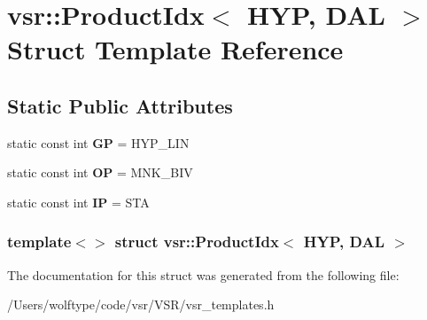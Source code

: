 \hypertarget{structvsr_1_1_product_idx_3_01_h_y_p_00_01_d_a_l_01_4}{\section{vsr\-:\-:Product\-Idx$<$ H\-Y\-P, D\-A\-L $>$ Struct Template Reference}
\label{structvsr_1_1_product_idx_3_01_h_y_p_00_01_d_a_l_01_4}
}
\subsection*{Static Public Attributes}
\begin{DoxyCompactItemize}
\item 
\hypertarget{structvsr_1_1_product_idx_3_01_h_y_p_00_01_d_a_l_01_4_ac0e6206708d4d06fa433d0d8071c514e}{static const int {\bfseries G\-P} = H\-Y\-P\-\_\-\-L\-I\-N}\label{structvsr_1_1_product_idx_3_01_h_y_p_00_01_d_a_l_01_4_ac0e6206708d4d06fa433d0d8071c514e}

\item 
\hypertarget{structvsr_1_1_product_idx_3_01_h_y_p_00_01_d_a_l_01_4_ae5b65ef5f90f28a8b465638ffb79276a}{static const int {\bfseries O\-P} = M\-N\-K\-\_\-\-B\-I\-V}\label{structvsr_1_1_product_idx_3_01_h_y_p_00_01_d_a_l_01_4_ae5b65ef5f90f28a8b465638ffb79276a}

\item 
\hypertarget{structvsr_1_1_product_idx_3_01_h_y_p_00_01_d_a_l_01_4_af9522b8b3551a0ee33306dcbff31515e}{static const int {\bfseries I\-P} = S\-T\-A}\label{structvsr_1_1_product_idx_3_01_h_y_p_00_01_d_a_l_01_4_af9522b8b3551a0ee33306dcbff31515e}

\end{DoxyCompactItemize}
\subsubsection*{template$<$$>$ struct vsr\-::\-Product\-Idx$<$ H\-Y\-P, D\-A\-L $>$}



The documentation for this struct was generated from the following file\-:\begin{DoxyCompactItemize}
\item 
/\-Users/wolftype/code/vsr/\-V\-S\-R/vsr\-\_\-templates.\-h\end{DoxyCompactItemize}
